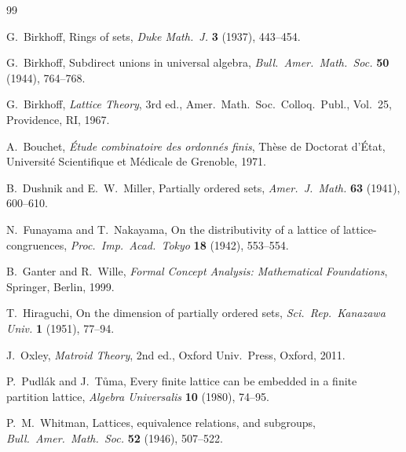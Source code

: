 \documentclass[11pt]{article}
\theoremstyle{definition}
\theoremstyle{remark}
\begin{document}
\begin{thebibliography}{99}

G.~Birkhoff, Rings of sets, \emph{Duke Math.\ J.} \textbf{3} (1937), 443--454.

G.~Birkhoff, Subdirect unions in universal algebra, \emph{Bull.\ Amer.\ Math.\ Soc.} \textbf{50} (1944), 764--768.

G.~Birkhoff, \emph{Lattice Theory}, 3rd ed., Amer.\ Math.\ Soc.\ Colloq.\ Publ., Vol.~25, Providence, RI, 1967.

A.~Bouchet, \emph{\'Etude combinatoire des ordonn\'es finis}, Th\`ese de Doctorat d'\'Etat, Universit\'e Scientifique et M\'edicale de Grenoble, 1971.

B.~Dushnik and E.~W.~Miller, Partially ordered sets, \emph{Amer.\ J.\ Math.} \textbf{63} (1941), 600--610.

N.~Funayama and T.~Nakayama, On the distributivity of a lattice of lattice-congruences, \emph{Proc.\ Imp.\ Acad.\ Tokyo} \textbf{18} (1942), 553--554.

B.~Ganter and R.~Wille, \emph{Formal Concept Analysis: Mathematical Foundations}, Springer, Berlin, 1999.

T.~Hiraguchi, On the dimension of partially ordered sets, \emph{Sci.\ Rep.\ Kanazawa Univ.} \textbf{1} (1951), 77--94.

J.~Oxley, \emph{Matroid Theory}, 2nd ed., Oxford Univ.\ Press, Oxford, 2011.

P.~Pudl\'ak and J.~T\r{u}ma, Every finite lattice can be embedded in a finite partition lattice, \emph{Algebra Universalis} \textbf{10} (1980), 74--95.

P.~M.~Whitman, Lattices, equivalence relations, and subgroups, \emph{Bull.\ Amer.\ Math.\ Soc.} \textbf{52} (1946), 507--522.

\end{thebibliography}
\end{document}
